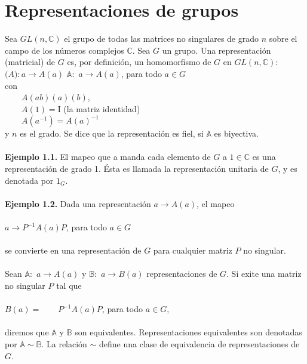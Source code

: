 \documentclass[12pt]{book}
\theoremstyle{definition}
\newcounter{in}
\newcounter{ini}
\begin{document}
\chapter{Representaciones de grupos}
\label{cha:Representaciones de grupos}
Sea $GL\left(n,\mathbb{C}\right)$ el grupo de todas las matrices no singulares de grado $n$ sobre el campo de los números complejos $\mathbb{C}$. Sea $G$ un grupo. Una representación  (matricial) de $G$ es, por definición, un homomorfismo de $G$ en  $GL\left(n,\mathbb{C}\right)$:\\
$\mathbb(A):a\rightarrow A\left(a\right)$
$\mathbb{A}:$ $a\rightarrow A\left(a\right)$, para todo $a\in G$\\
con\\
$\qquad A\left(ab\right)\left(a\right)\left(b\right)$,\\
$\qquad A\left(1\right)=\mathrm{I}$ (la matriz identidad)\\
$\qquad A\left(a^{-1}\right)=A\left(a\right)^{-1}$ \\
y $n$ es el grado. Se dice que la representación es fiel, si $\mathbb{A}$ es biyectiva.\\~\\
\textbf{Ejemplo 1.1.} El mapeo que a manda cada elemento de $G$ a $1 \in \mathbb{C}$ es una representación de grado 1. Ésta es llamada la representación unitaria de $G$, y es denotada por $1_{G}$.\\~\\
\textbf{Ejemplo 1.2.} Dada una representación $a \rightarrow A\left(a\right)$, el mapeo\\~\\
$a \rightarrow P^{-1}A\left(a\right)P$, para todo $a \in G$\\~\\
se convierte en una representación de $G$ para cualquier matriz $P$ no singular.\\~\\
Sean $\mathbb{A}:$ $a\rightarrow A\left(a\right)$ y $\mathbb{B}:$ $a\rightarrow B\left(a\right)$ representaciones de $G$. Si exite una matriz no singular $P$ tal que \\~\\
$B\left(a\right)=\qquad P^{-1}A\left(a\right)P$, para todo $a \in G$,\\~\\
diremos que $\mathbb{A}$ y $\mathbb{B}$ son equivalentes. Representaciones equivalentes son denotadas por $\mathbb{A} \sim \mathbb{B}$. La relación $\sim$ define una clase de equivalencia de representaciones de $G$.\\~\\
\end{document}
